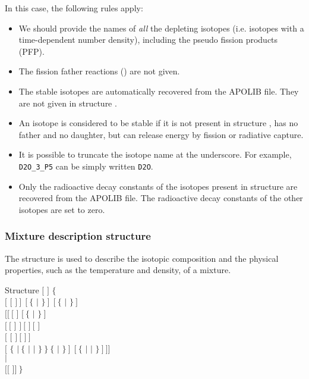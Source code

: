 \vskip 0.15cm

In this case, the following rules apply:
\begin{itemize}
\item We should provide the names  of {\sl all} the depleting
isotopes (i.e. isotopes with a time-dependent number density), including the
pseudo fission products (PFP).
\item The fission father reactions () are not given.
\item The stable isotopes are automatically recovered from the
APOLIB file. They are not given in structure .
\item An isotope is considered to be stable if it is not present in
structure , has no father and no daughter,
but can release energy by fission or radiative capture.
\item It is possible to truncate the isotope name  at the
underscore. For example, {\tt D2O\_3\_P5} can be simply written {\tt D2O}.
\item Only the radioactive decay constants of the isotopes present in
structure  are recovered from the APOLIB file. The
radioactive decay constants of the other isotopes are set to zero.
\end{itemize}

\subsubsection{Mixture description structure}\label{sect:descmix}

The structure  is used to describe the isotopic composition and
the physical properties, such as the temperature and density, of a mixture.

\begin{DataStructure}{Structure }
 $[$  $]$ $\{$ \\
\hskip 1.0cm $[$ $[$  $]~]~~[~\{$  $|$  $\}~]~~[~\{$ 
    $|$ $\}~]$\\
\hskip 2.0cm $[[~[$  \moc{=} $]$   $[~\{$  
    $|$  $\}~]$\\
\hskip 2.0cm $[~[$  $]$  $]~[$   $]~[$   $]$ \\
\hskip 2.0cm $[$    $[$   $]~[$  $]~]$ \\
\hskip 2.0cm $[$  $\{$  $|~\{$  $|$  $|$ $\}~\}~\{$
 $|$  $\}~]~~[~\{$  $|$  $|$  $\}~]~]]$ \\
\hskip 1.0cm $|$ \\
\hskip 1.0cm  $[[$   $]]~\}$
\end{DataStructure}

